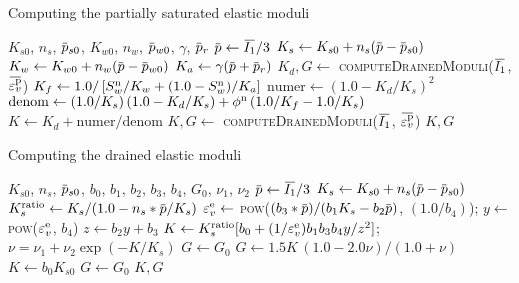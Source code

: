 \begin{breakablealgorithm}
  \caption{Computing the partially saturated elastic moduli}
  \begin{algorithmic}[1]
    \Require $K_{s0}$, $n_s$, $\pbar_{s0}$, $K_{w0}$, $n_w$, $\pbar_{w0}$, $\gamma$, $\pbar_r$
        \State $\pbar \leftarrow \Ionebar/3$
        \State $K_s \leftarrow K_{s0} + n_s (\pbar - \pbar_{s0})$
        \State $K_w \leftarrow K_{w0} + n_w (\pbar - \pbar_{w0})$
        \State $K_a \leftarrow \gamma (\pbar + \pbar_r)$
        \State $K_d, G \leftarrow$ \textsc{computeDrainedModuli}($\Ionebar$, $\bar{\Veps^\Tp_v}$)
        \State $K_f \leftarrow 1.0/\left[S_w^{\text{n}}/K_w + (1.0-S_w^{\text{n}})/K_a\right]$
        \State $\text{numer} \leftarrow (1.0 - K_d/K_s)^2$
        \State $\text{denom} \leftarrow (1.0/K_s)\,(1.0 - K_d/K_s) + \phi^{\text{n}}\,(1.0/K_f - 1.0/K_s)$
        \State $K \leftarrow K_d + \text{numer}/\text{denom}$
      \Else
        \State $K, G \leftarrow$ \textsc{computeDrainedModuli}($\Ionebar$, $\bar{\Veps^\Tp_v}$)
      \EndIf
      \State \Return $K, G$
    \EndProcedure
  \end{algorithmic}
\end{breakablealgorithm}

\begin{breakablealgorithm}
  \caption{Computing the drained elastic moduli}
  \begin{algorithmic}[1]
    \Require $K_{s0}$, $n_s$, $\pbar_{s0}$, $b_0$, $b_1$, $b_2$, $b_3$, $b_4$, $G_0$, $\nu_1$, $\nu_2$
        \State $\pbar \leftarrow \Ionebar/3$
        \State $K_s \leftarrow K_{s0} + n_s (\pbar - \pbar_{s0})$
        \State $K_s^\Tratio \leftarrow K_s/(1.0 - n_s*\pbar/K_s)$
        \State $\varepsilon^{\text{e}}_v \leftarrow$ \textsc{pow}($(b_3*\pbar)/(b_1K_s - b_2\pbar)$, $(1.0/b_4)$);
        \State $y \leftarrow $ \textsc{pow}($\varepsilon^{\text{e}}_v$, $b_4$)
        \State $z \leftarrow b_2y + b_3$
        \State $K \leftarrow K_s^{\text{ratio}}[b_0 + (1/\varepsilon^{\text{e}}_v)b_1b_3b_4y/z^2]$;
        \State $\nu = \nu_1 + \nu_2\exp(-K/K_s)$
        \State $ G \leftarrow G_0$
          \State $G \leftarrow 1.5K\,(1.0-2.0\nu)/(1.0+\nu)$
        \EndIf
      \Else
        \State $K \leftarrow b_0K_{s0}$
        \State $G \leftarrow G_0$
      \EndIf
      \State \Return $K, G$
    \EndProcedure
  \end{algorithmic}
\end{breakablealgorithm}

